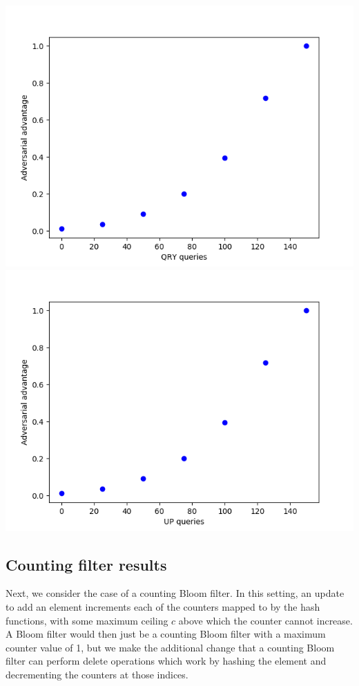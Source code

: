\includegraphics[scale=0.5]{Figure_6}
\includegraphics[scale=0.5]{Figure_7}

\subsection{Counting filter results}

Next, we consider the case of a counting Bloom filter. In this setting, an update to add an element increments each of the counters mapped to by the hash functions, with some maximum ceiling $c$ above which the counter cannot increase. A Bloom filter would then just be a counting Bloom filter with a maximum counter value of 1, but we make the additional change that a counting Bloom filter can perform delete operations which work by hashing the element and decrementing the counters at those indices.

